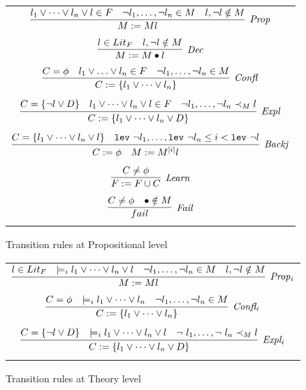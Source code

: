 \documentclass[11pt]{article}
\begin{document}
	\begin{figure}[t]
	\centering
	\begin{framed}
	\begin{tabular}{c}
		$\infer[\mathit{Prop}]{M := Ml}{l_1 \lor \cdots \lor 
			l_n \lor l \in F & \neg l_1,\ldots,\neg 
			l_n \in M & l, \neg l \notin M}$ \\ \\
		$\infer[\mathit{Dec}]{M := M \bullet l}{l \in 
			Lit_F & l, \neg l \notin 
			M}$ \\ \\
		$\infer[\mathit{Confl}]{C:=\{l_1 \lor \cdots \lor 
			l_n\}}{C = \phi & l_1 \lor \ldots \lor 
			l_n \in F & \neg l_1,\ldots,\neg l_n \in 
			M}$ \\ \\
		$\infer[\mathit{Expl}]{C := \{l_1 \lor \cdots \lor 
			l_n \lor D\}}{C = \{\neg l \lor D\} & 
			l_1 \lor \cdots \lor l_n \lor l \in F & 
			\neg l_1,\ldots,\neg l_n \prec_M l}$ \\ \\
		$\infer[\mathit{Backj}]{C := \phi\ \ \ M := M^{[i]}l}
		{C = \{l_1 \lor \cdots \lor l_n \lor l\} & 
			\texttt{lev}\ \neg l_1, \ldots , 
			\texttt{lev}\ \neg l_n \leq 
			i < \texttt{lev}\ \neg l}$ \\ \\
		$\infer[\mathit{Learn}]{F := F \cup C}{C \neq 
			\phi}$ \\ \\
		$\infer[\mathit{Fail}]{fail}{C \neq \phi & \bullet 
			\notin M}$ \\ \\
	\end{tabular}
	\end{framed}
	\caption{Transition rules at Propositional level}
	\label{fig:proprules}
	\end{figure}

	\begin{figure}[t]
	\centering
	\begin{framed}
	\begin{tabular}{c}
		$\infer[\mathit{Prop_i}]{M := Ml}{l \in Lit_F 
			 & \models_i l_1 \lor 
			\cdots \lor l_n \lor l & \neg l_1, 
			\ldots, \neg l_n \in M & l,\neg l 
			\notin M}$ \\ \\
		$\infer[\mathit{Confl_i}]{C := \{l_1 \lor \cdots 
			\lor l_n \}}{C = \phi & \models_i 
			l_1 \lor \cdots \lor l_n & \neg l_1, 
			\ldots, \neg l_n \in M}$ \\ \\
		$\infer[\mathit{Expl_i}]{C := \{l_1 \lor \cdots 
			\lor l_n \lor D\}}{C = \{\neg l 
			\lor D\} & \models_i l_1 \lor \cdots
			\lor l_n \lor l & \neg\ l_1, \ldots, 
			\neg\ l_n \prec_M l}$ \\ \\
	\end{tabular}
	\end{framed}
	\caption{Transition rules at Theory level}
		\label{fig:theoryrules}
	\end{figure}
\end{document}
